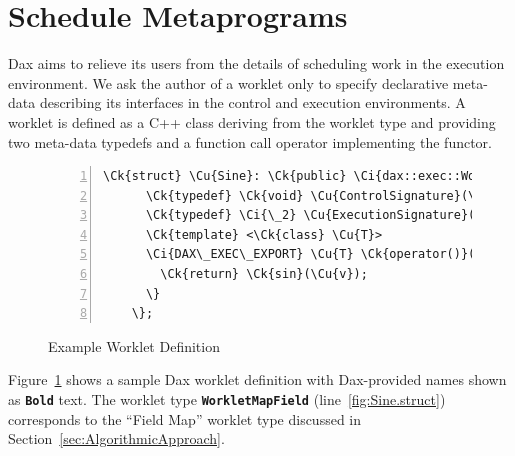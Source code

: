 \documentclass[conference]{IEEEtran}
\newcommand{\Ck}[1]{{#1}} %
\newcommand{\Ci}[1]{{\textbf{#1}}} %
\newcommand{\CiDesc}{\Ci{Bold}}
\newcommand{\Cu}[1]{{\color{gray}\textbf{#1}}} %
\newcommand{\Code}[1]{{\small\texttt{#1}}}
\begin{document}
\section{Schedule Metaprograms}
\label{sec:ScheduleMetaprograms}

\noindent
%
Dax aims to relieve its users from the details of scheduling work in
the execution environment.
%
We ask the author of a worklet only to specify declarative meta-data
describing its interfaces in the control and execution environments.
%
A worklet is defined as a C++ class deriving from the worklet type and
providing two meta-data typedefs and a function call operator
implementing the functor.

\begin{figure}[ht]\centering
  \begin{Verbatim}[commandchars=\\\{\}, gobble=4, frame=single,
                   fontfamily=tt, fontsize=\scriptsize,
                   numbers=left, numbersep=2pt]
    \Ck{struct} \Cu{Sine}: \Ck{public} \Ci{dax::exec::WorkletMapField} \{ \label{fig:Sine.struct}
      \Ck{typedef} \Ck{void} \Cu{ControlSignature}(\Ci{Field}(\Ci{In}), \Ci{Field}(\Ci{Out})); \label{fig:Sine.cont}
      \Ck{typedef} \Ci{\_2} \Cu{ExecutionSignature}(\Ci{\_1}); \label{fig:Sine.exec}
      \Ck{template} <\Ck{class} \Cu{T}>
      \Ci{DAX\_EXEC\_EXPORT} \Cu{T} \Ck{operator()}(\Cu{T} \Cu{v}) \Ck{const} \{ \label{fig:Sine.op}
        \Ck{return} \Ck{sin}(\Cu{v});
      \}
    \};
  \end{Verbatim}
  \caption{Example Worklet Definition}\label{fig:Sine}
\end{figure}

Figure~\ref{fig:Sine} shows a sample Dax worklet definition with
Dax-provided names shown as \Code{\CiDesc} text.
%
The worklet type \Code{\Ci{WorkletMapField}}
(line~\ref{fig:Sine.struct}) corresponds to the ``Field Map'' worklet
type discussed in Section~\ref{sec:AlgorithmicApproach}.
\end{document}
